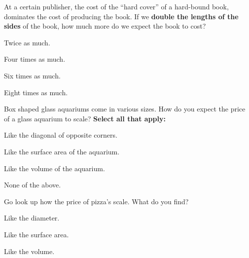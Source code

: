 \documentclass[noauthor,nooutcomes]{ximera}
\author{Bart Snapp}
\begin{document}
\maketitle







\begin{exercise}
 At a certain publisher, the cost of the ``hard cover'' of a
 hard-bound book, dominates the cost of producing the book. If we
 \textbf{double the lengths of the sides} of the book, how much more do we expect the
 book to cost?
 \begin{enumerate}
   \begin{multicols}{2}
   \item Twice as much.
   \item Four times as much.
   \item Six times as much.
   \item Eight times as much.
   \end{multicols}
 \end{enumerate}
\end{exercise}


\begin{exercise}
  Box shaped glass aquariums come in various sizes. How do you expect
  the price of a glass aquarium to scale?  \textbf{Select all that
    apply:}
 \begin{enumerate}
   \begin{multicols}{2}
   \item Like the diagonal of opposite corners.
   \item Like the surface area of the aquarium.
   \item Like the volume of the aquarium.
   \item None of the above.
   \end{multicols}
 \end{enumerate}
\end{exercise}



\begin{exercise}
  Go look up how the price of pizza's scale. What do you find?
 \begin{enumerate}
   \begin{multicols}{3}
   \item Like the diameter.
   \item Like the surface area.
   \item Like the volume.
   \end{multicols}
 \end{enumerate}
\end{exercise}
\end{document}
